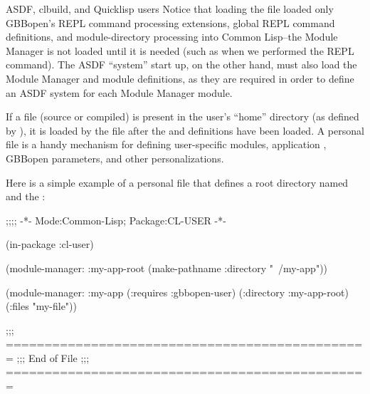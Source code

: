 \documentclass[10pt,twoside,english,pdftex]{article}
\begin{document}
\begin{notebox}{ASDF, clbuild, and Quicklisp users}
Notice that loading the  file
loaded only GBBopen's REPL command processing extensions, global REPL command
definitions, and module-directory processing into Common Lisp--the Module
Manager is not loaded until it is needed (such as when we performed the
 REPL command).  The ASDF 
``system'' start up, on the other hand, must also load the Module Manager and
module definitions, as they are required in order to define an ASDF system for
each Module Manager module.
\end{notebox}


%
%
%
%
%
%
If a  file (source or compiled) is present in
the user's ``home'' directory (as defined by
), it is loaded by the
 file after the
 and definitions have
been loaded.  A personal 
file is a handy mechanism for defining user-specific modules, application
, GBBopen parameters, and other personalizations.

Here is a simple example of a personal
 file that defines a root
directory named  and the 
:
%
\W\supp
\begin{example}
  ;;;; -*- Mode:Common-Lisp; Package:CL-USER -*-

  (in-package :cl-user)

  (module-manager: :my-app-root 
      (make-pathname :directory "~/my-app"))    

  (module-manager: :my-app
    (:requires :gbbopen-user)
    (:directory :my-app-root)
    (:files "my-file"))

  ;;; ===============================================
  ;;;   End of File
  ;;; ===============================================
\end{example}
\end{document}
